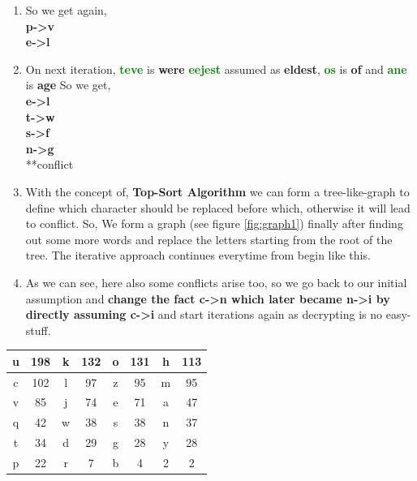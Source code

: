 \documentclass[12pt]{report}
\begin{document}
{\begin{enumerate}
\item{%
So we get again,\\
\textbf{p->v}\\
\textbf{e->l}\\}
\item{%
On next iteration, \textcolor{green}{\textbf{teve}} is \textbf{were} \textcolor{green}{\textbf{eejest}} assumed as \textbf{eldest},
\textcolor{green}{\textbf{os}} is \textbf{of} and \textcolor{green}{\textbf{ane}} is \textbf{age}
So we get,\\
\textbf{e->l}\\
\textbf{t->w}\\
\textbf{s->f}\\
\textbf{n->g}\\**conflict
}
\item{
With the concept of, \textbf{Top-Sort Algorithm} we can form a tree-like-graph to define which character should be replaced before which, otherwise it will lead to conflict. So, We form a graph (see figure \ref{fig:graph1}) finally after finding out some more words and replace the letters starting from the root of the tree. The iterative approach continues everytime from begin like this.}
\item{ As we can see, here also some conflicts arise too, so we go back to our initial assumption and \textbf{change the fact c->n which later became n->i by directly assuming c->i} and start iterations again as decrypting is no easy-stuff.}

\end{enumerate}
\begin{center}
\begin{tabular}{|c|c|c|c|c|c|c|c|}
\hline
u & 198 & k & 132 & o & 131 & h & 113 \\ \hline
c & 102 & l & 97 & z & 95 & m & 95 \\ \hline
v & 85 & j & 74 & e & 71 & a & 47 \\ \hline
q & 42 & w & 38 & s & 38 & n & 37 \\ \hline
t & 34 & d & 29 & g & 28 & y & 28 \\ \hline
p & 22 & r & 7 & b & 4 & 2 & 2 \\ \hline
\end{tabular}
\label{tab:freq2}
\end{center}

}
\end{document}
